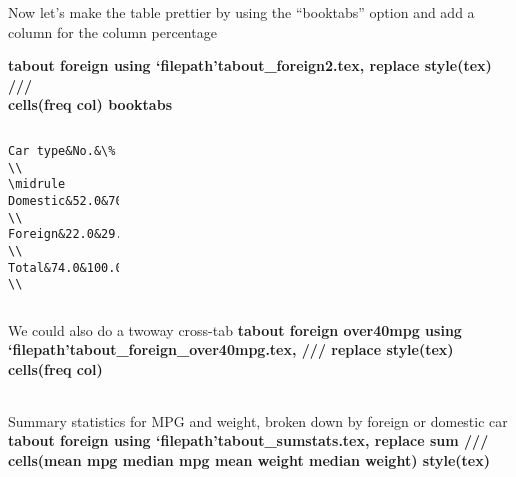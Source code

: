 \documentclass[fleqn, table, 10pt]{beamer}
\def\results{S:/trainings/exporting_stata_tables_figures/results}
\begin{document}
\begin{frame}[fragile]{ Now let's make the table prettier by using the ``booktabs'' option and add a column for the column percentage}
   
    \vspace{.5cm}
    \textbf{tabout foreign using `filepath'tabout\_foreign2.tex, replace style(tex) /// \\ cells(freq col) booktabs} \\
    \pause
    \begin{columns}[T]
            \flushleft
            \begin{verbatim}
Car type&No.&\% \\
\midrule
Domestic&52.0&70.3 \\
Foreign&22.0&29.7 \\
Total&74.0&100.0 \\
            \end{verbatim}
            \begin{tabular}{lrr}
                 
            \end{tabular}
    \end{columns}
\end{frame}

\begin{frame}[fragile]{We could also do a twoway cross-tab}
    \vspace{.5cm}
    \textbf{tabout foreign over40mpg using `filepath'tabout\_foreign\_over40mpg.tex, ///
        replace style(tex) cells(freq col)} \\
    \pause
    \vspace{.5cm}
    \begin{tabular}{lrrrrrr}
        
    \end{tabular}
\end{frame}

\begin{frame}[fragile]{Summary statistics for MPG and weight, broken down by foreign or domestic car}
    \vspace{.5cm}
    \textbf{tabout foreign using `filepath'tabout\_sumstats.tex, replace sum ///
        cells(mean mpg  median mpg mean weight median weight) style(tex)} \\
    \pause
    \vspace{.5cm}
    \begin{tabular}{lrrrrrr}
        
    \end{tabular}
\end{frame}
\end{document}
